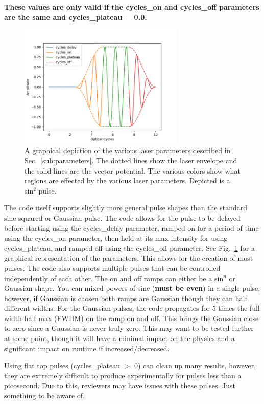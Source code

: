 \documentclass{article}
\begin{document}
\textbf{These values are only valid if the cycles\_on and cycles\_off parameters are the same and cycles\_plateau = 0.0.}
\begin{figure}[t]
\centering
\includegraphics[width=0.7\textwidth]{Pulse.png}
\caption{A graphical depiction of the various laser parameters described in Sec.~\ref{sub:parameters}. The dotted lines show the laser envelope and the solid lines are the vector potential. The various colors show what regions are effected by the various laser parameters. Depicted is a sin$^2$ pulse.}
\label{fig:pulse}
\end{figure}

The code itself supports slightly more general pulse shapes than the standard sine squared or Gaussian pulse. The code allows for the pulse to be delayed before starting using the cycles\_delay parameter, ramped on for a period of time using the cycles\_on parameter, then held at its max intensity for using cycles\_plateau, and ramped off using the cycles\_off parameter. See Fig.~\ref{fig:pulse} for a graphical representation of the parameters. This allows for the creation of most pulses. The code also supports multiple pulses that can be controlled independently of each other. The on and off ramps can either be a sin$^n$ or Gaussian shape. You can mixed powers of sine (\textbf{must be even}) in a single pulse, however, if Gaussian is chosen both ramps are Gaussian though they can half different widths. For the Gaussian pulses, the code propagates for 5 times the full width half max (FWHM) on the ramp on and off. This brings the Gaussian close to zero since a Gaussian is never truly zero. This may want to be tested further at some point, though it will have a minimal impact on the physics and a significant impact on runtime if increased/decreased.

Using flat top pulses (cycles\_plateau $>$ 0) can clean up many results, however, they are extremely difficult to produce experimentally for pulses less than a picosecond. Due to this, reviewers may have issues with these pulses. Just something to be aware of.
\end{document}
